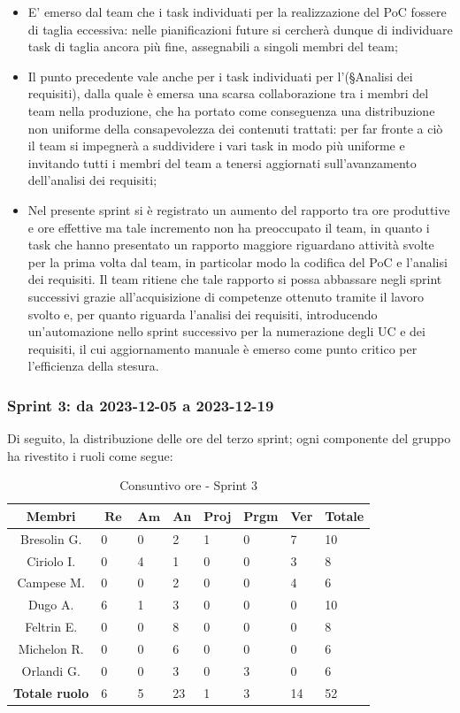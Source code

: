 \documentclass[10pt, a4paper]{article}
\begin{document}
{{{{{{{{{{{{{{{\begin{itemize}
    \item E' emerso dal team che i task individuati per la realizzazione del PoC fossere di taglia eccessiva: nelle pianificazioni future si cercherà
    dunque di individuare task di taglia ancora più fine, assegnabili a singoli membri del team;
    \item Il punto precedente vale anche per i task individuati per l'(\S Analisi dei requisiti), dalla quale è emersa una scarsa collaborazione
    tra i membri del team nella produzione, che ha portato come conseguenza una distribuzione non uniforme della consapevolezza dei contenuti trattati: per 
    far fronte a ciò il team si impegnerà a suddividere i vari task in modo più uniforme e invitando tutti i membri del team a tenersi aggiornati 
    sull'avanzamento dell'analisi dei requisiti;
    \item Nel presente sprint si è registrato un aumento del rapporto tra ore produttive e ore effettive ma tale incremento non ha preoccupato il team, 
    in quanto i task che hanno presentato un rapporto maggiore riguardano attività svolte per la prima volta dal team, in particolar modo la codifica del PoC
    e l'analisi dei requisiti. Il team ritiene che tale rapporto si possa abbassare negli sprint successivi grazie all'acquisizione di competenze ottenuto tramite
    il lavoro svolto e, per quanto riguarda l'analisi dei requisiti, introducendo un'automazione nello sprint successivo per la numerazione degli UC e dei requisiti, 
    il cui aggiornamento manuale è emerso come punto critico per l'efficienza della stesura.
\end{itemize}
\subsubsection{Sprint 3: da 2023-12-05 a 2023-12-19}
Di seguito, la distribuzione delle ore del terzo sprint; ogni componente del gruppo ha rivestito i ruoli come segue:

\begin{table}[H]
    \begin{tabularx}{\textwidth}{c|X|X|X|X|X|X|X}
        \textbf{Membri} & $\operatorname{\textbf{Re}}$ & $\mathrm{\textbf{Am}}$ & \textbf{An} & \textbf{Proj} & \textbf{Prgm} & \textbf{Ver} & \textbf{Totale} \\
        \hline Bresolin G. & 0 & 0 & 2 & 1 & 0 & 7 & 10 \\
        \hline Ciriolo I.  & 0 & 4 & 1 & 0 & 0 & 3 & 8 \\
        \hline Campese M.  & 0 & 0 & 2 & 0 & 0 & 4 & 6 \\
        \hline Dugo A.     & 6 & 1 & 3 & 0 & 0 & 0 & 10 \\
        \hline Feltrin E.  & 0 & 0 & 8 & 0 & 0 & 0 & 8 \\
        \hline Michelon R. & 0 & 0 & 6 & 0 & 0 & 0 & 6 \\
        \hline Orlandi G.  & 0 & 0 & 3 & 0 & 3 & 0 & 6 \\
        \hline
        \textbf{Totale ruolo} & 6 & 5 & 23 & 1 & 3 & 14 & 52 
    \end{tabularx}
    \caption{Consuntivo ore - Sprint 3}
\end{table}

}}}}}}}}}}}}}}}
\end{document}
